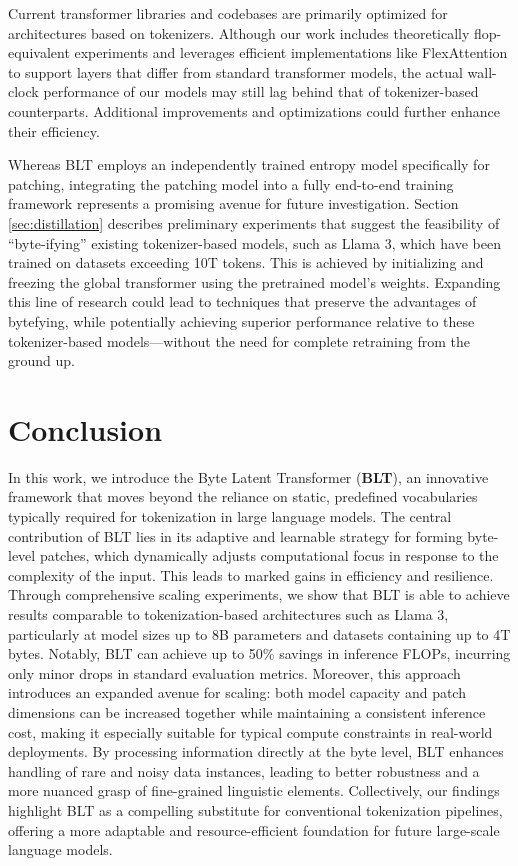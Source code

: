 Current transformer libraries and codebases are primarily optimized for architectures based on tokenizers. Although our work includes theoretically flop-equivalent experiments and leverages efficient implementations like FlexAttention to support layers that differ from standard transformer models, the actual wall-clock performance of our models may still lag behind that of tokenizer-based counterparts. Additional improvements and optimizations could further enhance their efficiency.

Whereas {\textsc BLT} employs an independently trained entropy model specifically for patching, integrating the patching model into a fully end-to-end training framework represents a promising avenue for future investigation. Section \ref{sec:distillation} describes preliminary experiments that suggest the feasibility of ``byte-ifying'' existing tokenizer-based models, such as Llama 3, which have been trained on datasets exceeding 10T tokens. This is achieved by initializing and freezing the global transformer using the pretrained model’s weights. Expanding this line of research could lead to techniques that preserve the advantages of bytefying, while potentially achieving superior performance relative to these tokenizer-based models—without the need for complete retraining from the ground up.

\section{Conclusion}
\label{section:conclusion}

In this work, we introduce the Byte Latent Transformer (\textbf{BLT}), an innovative framework that moves beyond the reliance on static, predefined vocabularies typically required for tokenization in large language models. The central contribution of {\textsc BLT} lies in its adaptive and learnable strategy for forming byte-level patches, which dynamically adjusts computational focus in response to the complexity of the input. This leads to marked gains in efficiency and resilience. Through comprehensive scaling experiments, we show that {\textsc BLT} is able to achieve results comparable to tokenization-based architectures such as Llama 3, particularly at model sizes up to 8B parameters and datasets containing up to 4T bytes. Notably, {\textsc BLT} can achieve up to 50\% savings in inference FLOPs, incurring only minor drops in standard evaluation metrics. Moreover, this approach introduces an expanded avenue for scaling: both model capacity and patch dimensions can be increased together while maintaining a consistent inference cost, making it especially suitable for typical compute constraints in real-world deployments. By processing information directly at the byte level, {\textsc BLT} enhances handling of rare and noisy data instances, leading to better robustness and a more nuanced grasp of fine-grained linguistic elements. Collectively, our findings highlight {\textsc BLT} as a compelling substitute for conventional tokenization pipelines, offering a more adaptable and resource-efficient foundation for future large-scale language models.

